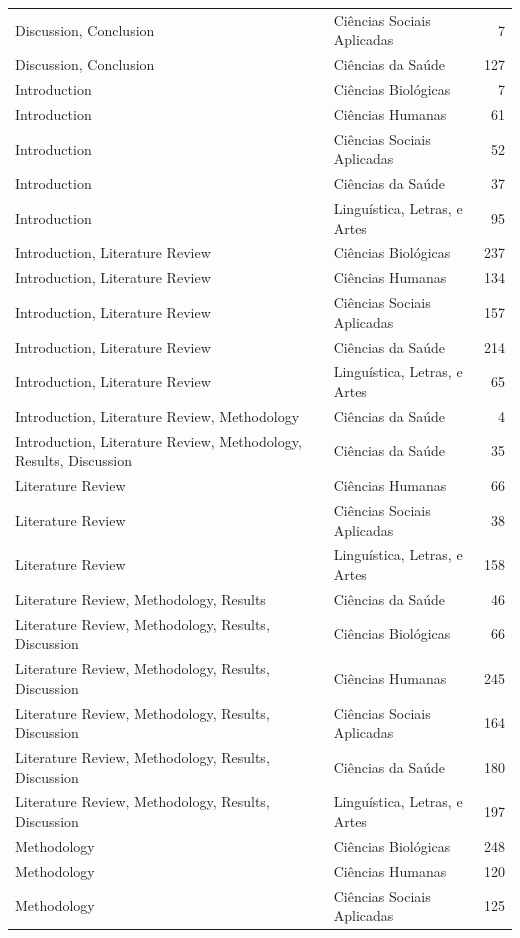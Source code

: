 \begin{longtable}{llr}
Discussion, Conclusion & Ciências Sociais Aplicadas & 7 \\
Discussion, Conclusion & Ciências da Saúde & 127 \\
Introduction & Ciências Biológicas & 7 \\
Introduction & Ciências Humanas & 61 \\
Introduction & Ciências Sociais Aplicadas & 52 \\
Introduction & Ciências da Saúde & 37 \\
Introduction & Linguística, Letras, e Artes & 95 \\
Introduction, Literature Review & Ciências Biológicas & 237 \\
Introduction, Literature Review & Ciências Humanas & 134 \\
Introduction, Literature Review & Ciências Sociais Aplicadas & 157 \\
Introduction, Literature Review & Ciências da Saúde & 214 \\
Introduction, Literature Review & Linguística, Letras, e Artes & 65 \\
Introduction, Literature Review, Methodology & Ciências da Saúde & 4 \\
Introduction, Literature Review, Methodology, Results, Discussion & Ciências da Saúde & 35 \\
Literature Review & Ciências Humanas & 66 \\
Literature Review & Ciências Sociais Aplicadas & 38 \\
Literature Review & Linguística, Letras, e Artes & 158 \\
Literature Review, Methodology, Results & Ciências da Saúde & 46 \\
Literature Review, Methodology, Results, Discussion & Ciências Biológicas & 66 \\
Literature Review, Methodology, Results, Discussion & Ciências Humanas & 245 \\
Literature Review, Methodology, Results, Discussion & Ciências Sociais Aplicadas & 164 \\
Literature Review, Methodology, Results, Discussion & Ciências da Saúde & 180 \\
Literature Review, Methodology, Results, Discussion & Linguística, Letras, e Artes & 197 \\
Methodology & Ciências Biológicas & 248 \\
Methodology & Ciências Humanas & 120 \\
Methodology & Ciências Sociais Aplicadas & 125 \\

\end{longtable}
